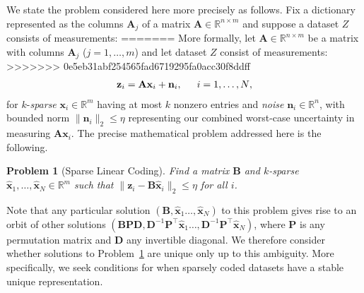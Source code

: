 \documentclass[9pt,twocolumn]{pnas-new}
\newtheorem{problem}{Problem}
\begin{document}
We state the problem considered here more precisely as follows. Fix a dictionary represented as the columns $\mathbf{A}_j$ of a matrix $\mathbf{A} \in \mathbb R^{n \times m}$ and suppose a dataset $Z$ consists of measurements:
=======
More formally, let $\mathbf{A} \in \mathbb R^{n \times m}$ be a matrix with columns $\mathbf{A}_j$ ($j = 1,\ldots,m$) and let dataset $Z$ consist of measurements:
>>>>>>> 0e5eb31abf254565fad6719295fa0acc30f8ddff
\begin{align}\label{LinearModel}
\mathbf{z}_i = \mathbf{A}\mathbf{x}_i + \mathbf{n}_i,\indent \text{$i=1,\ldots,N$},
\end{align}
for $k$-\emph{sparse} $\mathbf{x}_i \in \mathbb{R}^m$ having at most $k$ nonzero entries and \emph{noise} $\mathbf{n}_i \in \mathbb{R}^n$, with bounded norm $\| \mathbf{n}_i \|_2 \leq  \eta$ representing our combined worst-case uncertainty in  measuring $\mathbf{A}\mathbf{x}_i$.
The precise mathematical problem addressed here is the following.

\begin{problem}[Sparse Linear Coding]\label{InverseProblem}
Find a matrix $\mathbf{B}$ and $k$-sparse $\mathbf{\hat x}_1, \ldots, \mathbf{\hat x}_N \in \mathbb{R}^m$ such that $\|\mathbf{z}_i - \mathbf{B}\mathbf{\hat x}_i\|_2 \leq \eta$ for all $i$.
\end{problem}

Note that any particular solution $(\mathbf{B}, \mathbf{\hat x}_1 \ldots, \mathbf{\hat x}_N)$ to this problem gives rise to an orbit of other solutions $(\mathbf{BPD}, \mathbf{D}^{-1}\mathbf{P}^{\top}\mathbf{\hat x}_1 \ldots, \mathbf{D}^{-1}\mathbf{P}^{\top}\mathbf{\hat x}_N)$, where $\mathbf{P}$ is any permutation matrix and $\mathbf{D}$ any invertible diagonal.  
We therefore consider whether solutions to Problem~\ref{InverseProblem} are unique only up to this ambiguity.  More specifically, 
we seek conditions for when sparsely coded datasets have a stable unique representation.
\end{document}
